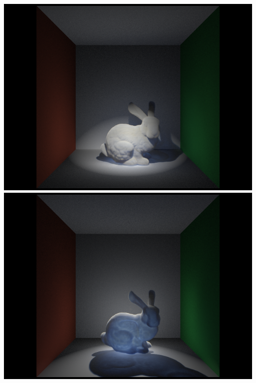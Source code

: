 \documentclass[10pt,compress,professionalfont]{beamer}
\begin{document}
\begin{frame}[c]{}

    \begin{columns}
        \begin{column}{0.5\textwidth}
            \includegraphics[width=\textwidth]{../img/bunny_spot/spot_front}\\
            \includegraphics[width=\textwidth]{../img/bunny_spot/spot_behind}\\


\end{column}
\end{columns}
\end{frame}
\end{document}
